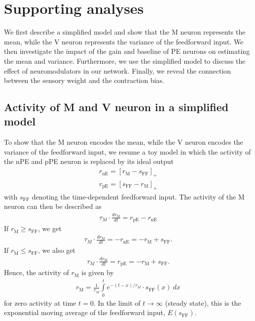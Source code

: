 \documentclass[10pt,a4paper]{article}
\begin{document}
\section{Supporting analyses}

We first describe a simplified model and show that the M neuron represents the mean, while the V neuron represents the variance of the feedforward input. We then investigate the impact of the gain and baseline of PE neurons on estimating the mean and variance. Furthermore, we use the simplified model to discuss the effect of neuromodulators in our network. Finally, we reveal the connection between the sensory weight and the contraction bias.

\subsection{Activity of M and V neuron in a simplified model}\label{sec:toy}
%
To show that the M neuron encodes the mean, while the V neuron encodes the variance of the feedforward input, we resume a toy model in which the activity of the nPE and pPE neuron is replaced by its ideal output
%
\begin{align}
r_\mathrm{nE} = \left[ r_\mathrm{M} - s_\mathrm{FF}\right]_+ \nonumber \\
r_\mathrm{pE} = \left[ s_\mathrm{FF} - r_\mathrm{M} \right]_+
\end{align}
%
with $s_\mathrm{FF}$ denoting the time-dependent feedforward input. The activity of the M neuron can then be described as
%
\begin{align}
\tau_M \cdot \frac{dr_\mathrm{M}}{dt} = r_\mathrm{pE} - r_\mathrm{nE}
\end{align}
%
If $r_\mathrm{M} \geq s_\mathrm{FF}$, we get
%
\begin{align}
\tau_M \cdot \frac{dr_\mathrm{M}}{dt} = -r_\mathrm{nE} = -r_\mathrm{M} + s_\mathrm{FF}.
\end{align}
%
If $r_\mathrm{M} \leq s_\mathrm{FF}$, we also get
%
\begin{align}
\tau_M \cdot \frac{dr_\mathrm{M}}{dt} = r_\mathrm{pE} = -r_\mathrm{M} + s_\mathrm{FF}.\nonumber
\end{align}
%
Hence, the activity of $r_\mathrm{M}$ is given by
%
\begin{align}
r_\mathrm{M} = \frac{1}{\tau_M} \int\limits_0^t e^{-(t-x)/\tau_M}\cdot s_\mathrm{FF}(x)\ dx
\end{align}  
%
for zero activity at time $t=0$. In the limit of $t\rightarrow \infty$ (steady state), this is the exponential moving average of the feedforward input, $E(s_\mathrm{FF})$.
\end{document}
